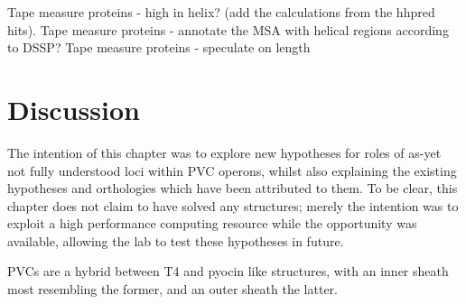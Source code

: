 Tape measure proteins - high in helix? (add the calculations from the hhpred hits).
Tape measure proteins - annotate the MSA with helical regions according to DSSP?
Tape measure proteins - speculate on length


\clearpage
\section{Discussion}
The intention of this chapter was to explore new hypotheses for roles of as-yet not fully understood loci within PVC operons, whilst also explaining the existing hypotheses and orthologies which have been attributed to them. To be clear, this chapter does not claim to have solved any structures; merely the intention was to exploit a high performance computing resource while the opportunity was available, allowing the lab to test these hypotheses in future.

PVCs are a hybrid between T4 and pyocin like structures, with an inner sheath most resembling the former, and an outer sheath the latter.



